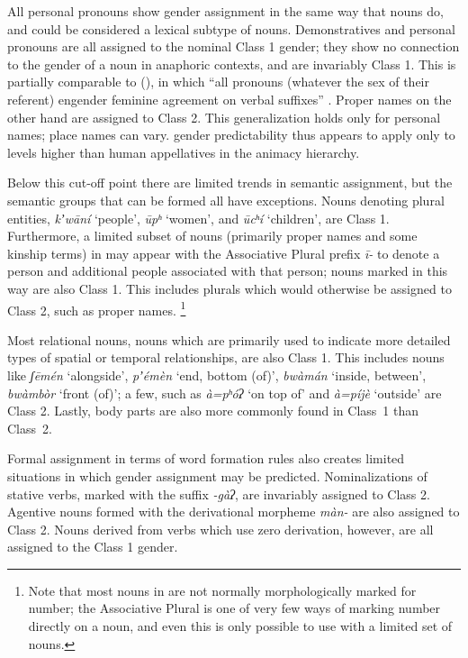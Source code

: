 \documentclass[output=collectionpaper,hidelinks]{langscibook}
\theoremstyle{remark}
\begin{document}
All personal pronouns show gender assignment in the same way that nouns do, and
could be considered a lexical subtype of nouns.  Demonstratives and personal
pronouns are all assigned to the nominal Class 1 gender; they show no connection
to the gender of a noun in anaphoric contexts, and are invariably Class 1.  This
is partially comparable to  (), in which ``all pronouns (whatever
the sex of their referent) engender feminine agreement on verbal suffixes''
\citep[488]{Dixon2000}.  Proper names on the other hand are assigned
to Class 2.  This generalization holds only for personal names; place names can
vary.   gender predictability thus appears to apply only to levels higher
than human appellatives in the animacy hierarchy.

Below this cut-off point there are limited trends in semantic assignment, but
the semantic groups that can be formed all have exceptions.  Nouns denoting
plural entities, \emph{kʼwāní} `people', \emph{ūpʰ} `women', and
\emph{ūcʰí} `children', are Class 1.  Furthermore, a limited subset of nouns
(primarily proper names and some kinship terms) in  may appear with the
Associative Plural prefix \emph{ī-} to denote a person and additional
people associated with that person; nouns marked in this way are also Class 1.
This includes plurals which would otherwise be assigned to Class 2, such as
proper names.%
\footnote{Note that most nouns in  are not normally morphologically
marked for number; the Associative Plural is one of very few ways of marking
number directly on a noun, and even this is only possible to use with a limited
set of nouns.}

Most relational nouns, nouns which are primarily used to indicate more detailed
types of spatial or temporal relationships, are also Class 1. This includes
nouns like \emph{ʃēmén} `alongside', \emph{pʼémèn} `end, bottom (of)',
\emph{bwàmán} `inside, between', \emph{bwàmbòr} `front (of)'; a few, such as
\emph{à=pʰóʔ} `on top of' and \emph{à=píjè} `outside' are Class 2. Lastly,
body parts are also more commonly found in Class~1 than Class~2.

Formal assignment in terms of word formation rules also creates limited
situations in which gender assignment may be predicted. Nominalizations of
stative verbs, marked with the suffix \emph{-gàʔ}, are invariably assigned to
Class 2. Agentive nouns formed with the derivational morpheme \emph{màn-} are
also assigned to Class 2. Nouns derived from verbs which use zero derivation,
however, are all assigned to the Class 1 gender.
\end{document}
